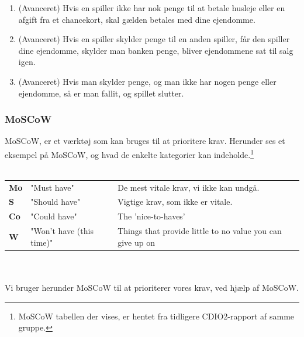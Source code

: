 \begin{enumerate}
\item (Avanceret) Hvis en spiller ikke har nok penge til at betale husleje eller en afgift fra et chancekort, skal gælden betales med dine ejendomme.
\item (Avanceret) Hvis en spiller skylder penge til en anden spiller, får den spiller dine ejendomme, skylder man banken penge, bliver ejendommene sat til salg igen.
\item (Avanceret) Hvis man skylder penge, og man ikke har nogen penge eller ejendomme, så er man fallit, og spillet slutter.\\
\end{enumerate}

\newpage

\subsubsection{MoSCoW}

MoSCoW, er et værktøj som kan bruges til at prioritere krav.
Herunder ses et eksempel på MoSCoW, og hvad de enkelte kategorier kan indeholde.\footnote{MoSCoW tabellen der vises, er hentet fra tidligere CDIO2-rapport af samme gruppe.} \\\\

\begin{tabular}{lll}
    \textbf{Mo} &   
    "Must have"                 &
    De mest vitale krav, vi ikke kan undgå. \\

    \textbf{S}  &   
    "Should have"               & 
    Vigtige krav, som ikke er vitale. \\

    \textbf{Co} &   
    "Could have"                & 
    The 'nice-to-haves' \\

    \textbf{W}  &   
    "Won’t have (this time)"    & 
    Things that provide little to no value you can give up on \\

\end{tabular}
\\\\

\noindent Vi bruger herunder MoSCoW til at prioriterer vores krav, ved hjælp af MoSCoW.

